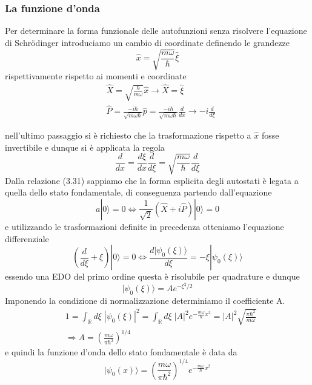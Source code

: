 \subsubsection{La funzione d'onda}

Per determinare la forma funzionale delle autofunzioni senza risolvere l'equazione di Schr\"odinger introduciamo un cambio di coordinate definendo le grandezze 
\begin{equation*}
	\hat{x} = \sqrt{\frac{m \omega }{\hbar}}\hat{\xi}
\end{equation*}
rispettivamente rispetto ai momenti e coordinate 
\begin{align*}
	& \hat{X} = \sqrt{\frac{\hbar}{m\omega}}\hat{x}  \to \hat{X} = \hat{\xi} \\[0.5cm]
	& \hat{P} = \frac{-i \hbar }{\sqrt{m\omega \hbar}}  \hat{p} = \frac{-i \hbar }{\sqrt{m\omega \hbar}} \frac{d}{dx} \to -i \frac{d}{d\xi}
\end{align*}

nell'ultimo passaggio si \`e richiesto che la trasformazione rispetto a $\hat{x}$ fosse invertibile e dunque si \`e applicata la regola 
\begin{equation*}
	\frac{d}{dx} = \frac{d \xi}{dx} \frac{d}{d\xi} = \sqrt{\frac{m \omega }{\hbar}} \frac{d}{d \xi }
\end{equation*}
Dalla relazione (3.31) sappiamo che la forma esplicita degli autostati \`e legata a quella dello stato fondamentale, di conseguenza partendo dall'equazione
\begin{equation*}
	a | 0 \rangle = 0 \iff \frac{1}{\sqrt{2}}(\hat{X}+i \hat{P})|0\rangle  = 0 
\end{equation*}
e utilizzando le trasformazioni definite in precedenza otteniamo l'equazione differenziale
\begin{equation*}
	\left ( \frac{d}{d\xi} + \xi \right)|0 \rangle = 0 \iff \frac{d|\psi_0(\xi) \rangle }{d\xi} = -\xi|\psi_0(\xi) \rangle 
\end{equation*}
essendo una EDO del primo ordine questa \`e risolubile per quadrature e dunque
\begin{equation*}
	|\psi_0 (\xi)\rangle = A e^{-\xi^2/2} 
\end{equation*}
Imponendo la condizione di normalizzazione determiniamo il coefficiente A.
\begin{align*}
	& 1 = \int_{\mathbb{R}}d\xi \;  |\psi_0(\xi)|^2 = \int_{\mathbb{R}}d\xi \; |A|^2 e^{-\frac{m\omega}{\hbar}x^2} = |A|^2 \sqrt{\frac{\pi \hbar^2}{m \omega}}\\[0.5cm]
	& \Rightarrow A = \left (\frac{m\omega}{\pi \hbar^2}\right)^{1/4}
\end{align*}
e quindi la funzione d'onda dello stato fondamentale \`e data da 
\begin{equation}
	|\psi_0 (x)\rangle = \left (\frac{m\omega}{\pi \hbar^2}\right)^{1/4} e^{-\frac{m\omega}{\hbar}x^2}
\end{equation}
\newpage


